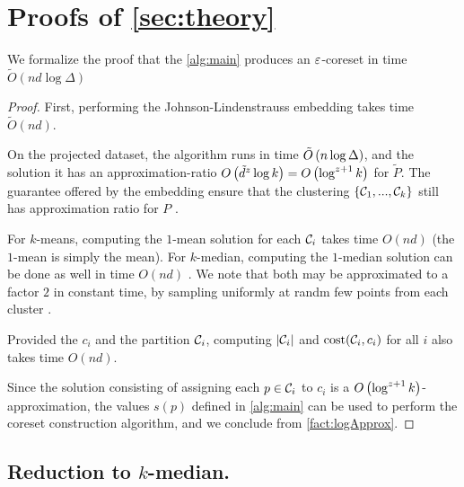 \section{Proofs of \cref{sec:theory}}\label{app:theory}

We formalize the proof that the \cref{alg:main} produces an $\varepsilon$-coreset in time $\tilde O(nd \log \Delta)$
\begin{proof}
First, performing the Johnson-Lindenstrauss embedding takes time $\tilde O(nd)$.

On the projected dataset, the algorithm \fkmeans runs in time $\tilde O\left( n \log \Delta\right)$, and the solution it has an approximation-ratio $O\left( \tilde{d}^z \log k\right) = O\left(\log^{z+1} k\right)$ for $\tilde P$. 
The guarantee offered by the embedding ensure that the clustering $\left\{ \mathcal C_1,...,\mathcal C_k\right\}$ still has approximation ratio for $P$ \cite{makarychev2019performance}. 

For $k$-means, computing the $1$-mean solution for each $\mathcal C_i$ takes time $O(nd)$ (the $1$-mean is simply the mean). 
For $k$-median, computing the $1$-median solution can be done as well in time $O(nd)$ \cite{CohenLMPS16}. 
We note that both may be approximated to a factor $2$ in constant time, by sampling uniformly at randm few points from each cluster \cite{neurips21}.

Provided the $c_i$ and the partition $\mathcal C_i$, computing $|\mathcal C_i|$ and $\operatorname{cost}(\mathcal C_i, c_i)$ for all $i$ also takes time $O(nd)$.

Since the solution consisting of assigning each $p \in \mathcal C_i$ to $c_i$ is a $O\left( \log^{z+1} k\right)$-approximation, the values $s(p)$ defined in \cref{alg:main} can be used to perform the coreset construction algorithm, and we conclude from \cref{fact:logApprox}.
\end{proof}


\subsection{Reduction to $k$-median.}
\label{app:redKM}

